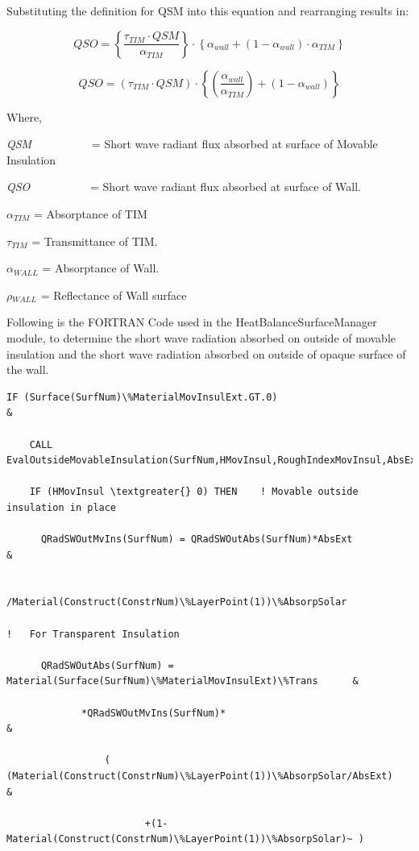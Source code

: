 Substituting the definition for QSM into this equation and rearranging results in:

\begin{equation}
QSO = \left\{ {\frac{{{\tau_{TIM}}\cdot QSM}}{{{\alpha_{TIM}}}}} \right\}\cdot \left\{ {{\alpha_{wall}} + \left( {1 - {\alpha_{wall}}} \right)\cdot {\alpha_{TIM}}} \right\}
\end{equation}

\begin{equation}
QSO = \left( {{\tau_{TIM}}\cdot QSM} \right)\cdot \left\{ {\left( {\frac{{{\alpha_{wall}}}}{{{\alpha_{TIM}}}}} \right) + \left( {1 - {\alpha_{wall}}} \right)} \right\}
\end{equation}

Where,

\emph{QSM}~~~~~~~~~~ = Short wave radiant flux absorbed at surface of Movable Insulation

\emph{QSO}~~~~~~~~~~ = Short wave radiant flux absorbed at surface of Wall.

$\alpha$\(_{TIM}\) = Absorptance of TIM

$\tau$\(_{TIM}\) = Transmittance of TIM.

$\alpha$\(_{WALL}\) = Absorptance of Wall.

$\rho$\(_{WALL}\) = Reflectance of Wall surface

Following is the FORTRAN Code used in the HeatBalanceSurfaceManager module, to determine the short wave radiation absorbed on outside of movable insulation and the short wave radiation absorbed on outside of opaque surface of the wall.

\begin{lstlisting}
IF (Surface(SurfNum)\%MaterialMovInsulExt.GT.0)                                           &

    CALL EvalOutsideMovableInsulation(SurfNum,HMovInsul,RoughIndexMovInsul,AbsExt)

    IF (HMovInsul \textgreater{} 0) THEN    ! Movable outside insulation in place

      QRadSWOutMvIns(SurfNum) = QRadSWOutAbs(SurfNum)*AbsExt                              &

                       /Material(Construct(ConstrNum)\%LayerPoint(1))\%AbsorpSolar

!   For Transparent Insulation

      QRadSWOutAbs(SurfNum) = Material(Surface(SurfNum)\%MaterialMovInsulExt)\%Trans      &

             *QRadSWOutMvIns(SurfNum)*                                                    &

                 (  (Material(Construct(ConstrNum)\%LayerPoint(1))\%AbsorpSolar/AbsExt)   &

                        +(1-Material(Construct(ConstrNum)\%LayerPoint(1))\%AbsorpSolar)~ )
\end{lstlisting}


